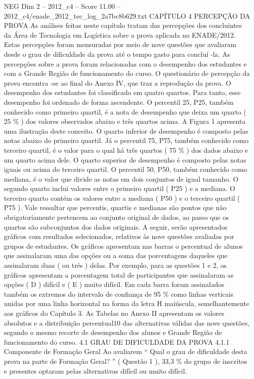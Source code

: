 \begin{textsample}{NEG Dim 2 – 2012\_c4 – Score 11.00 – 2012\_c4/enade\_2012\_tec\_log\_2a7bc8b629.txt}  \label{ex:f2_neg_333}
CAPÍTULO 4 PERCEPÇÃO DA PROVA As análises feitas neste capítulo tratam das percepções dos concluintes da Área de Tecnologia em Logística sobre a prova aplicada no ENADE/2012.
Estas percepções foram mensuradas por meio de nove questões que avaliaram desde o grau de dificuldade da prova até o tempo gasto para concluí -la.
As percepções sobre a prova foram relacionadas com o desempenho dos estudantes e com a Grande Região de funcionamento do curso.
O questionário de percepção da prova encontra -se ao final do Anexo IV, que traz a reprodução da prova.
O desempenho dos estudantes foi classificado em quatro quartos.
Para tanto, esse desempenho foi ordenado de forma ascendente.
O percentil 25, P25, também conhecido como primeiro quartil, é a nota de desempenho que deixa um quarto ( 25 \% ) dos valores observados abaixo e três quartos acima.
A Figura 1 apresenta uma ilustração deste conceito.
O quarto inferior de desempenho é composto pelas notas abaixo do primeiro quartil.
Já o percentil 75, P75, também conhecido como terceiro quartil, é o valor para o qual há três quartos ( 75 \% ) dos dados abaixo e um quarto acima dele.
O quarto superior de desempenho é composto pelas notas iguais ou acima do terceiro quartil.
O percentil 50, P50, também conhecido como mediana, é o valor que divide as notas em dois conjuntos de igual tamanho.
O segundo quarto inclui valores entre o primeiro quartil ( P25 ) e a mediana.
O terceiro quarto contém os valores entre a mediana ( P50 ) e o terceiro quartil ( P75 ).
Vale ressaltar que percentis, quartis e medianas são pontos que não obrigatoriamente pertencem ao conjunto original de dados, ao passo que os quartos são subconjuntos dos dados originais.
A seguir, serão apresentados gráficos com resultados selecionados, relativos às nove questões avaliadas por grupos de estudantes.
Os gráficos apresentam nas barras o percentual de alunos que assinalaram uma das opções ou a soma das porcentagens daqueles que assinalaram duas ( ou três ) delas.
Por exemplo, para as questões 1 e 2, os gráficos apresentam a porcentagem total de participantes que assinalaram as opções ( D ) difícil e ( E ) muito difícil.
Em cada barra foram assinalados também os extremos do intervalo de confiança de 95 \% como linhas verticais unidas por uma linha horizontal na forma da letra H maiúscula, semelhantemente aos gráficos do Capítulo 3.
As Tabelas no Anexo II apresentam os valores absolutos e a distribuição percentual10 das alternativas válidas das nove questões, segundo o mesmo recorte de desempenho dos alunos e Grande Região de funcionamento do curso. 4.1 GRAU DE DIFICULDADE DA PROVA 4.1.1 Componente de Formação Geral Ao avaliarem “ Qual o grau de dificuldade desta prova na parte de Formação Geral? ” ( Questão 1 ), 33,3 \% do grupo de inscritos e presentes optaram pelas alternativas difícil ou muito difícil.

\end{textsample}

